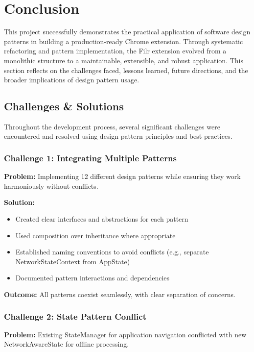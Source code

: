 \documentclass[11pt, a4paper]{article}
\theoremstyle{plain}
\theoremstyle{definition}
\begin{document}
\newpage
\section{Conclusion}

This project successfully demonstrates the practical application of software design patterns in building a production-ready Chrome extension. Through systematic refactoring and pattern implementation, the Filr extension evolved from a monolithic structure to a maintainable, extensible, and robust application. This section reflects on the challenges faced, lessons learned, future directions, and the broader implications of design pattern usage.

\subsection{Challenges \& Solutions}

Throughout the development process, several significant challenges were encountered and resolved using design pattern principles and best practices.

\subsubsection{Challenge 1: Integrating Multiple Patterns}

\textbf{Problem:} Implementing 12 different design patterns while ensuring they work harmoniously without conflicts.

\textbf{Solution:} 
\begin{itemize}
    \item Created clear interfaces and abstractions for each pattern
    \item Used composition over inheritance where appropriate
    \item Established naming conventions to avoid conflicts (e.g., separate NetworkStateContext from AppState)
    \item Documented pattern interactions and dependencies
\end{itemize}

\textbf{Outcome:} All patterns coexist seamlessly, with clear separation of concerns.

\subsubsection{Challenge 2: State Pattern Conflict}

\textbf{Problem:} Existing StateManager for application navigation conflicted with new NetworkAwareState for offline processing.
\end{document}

